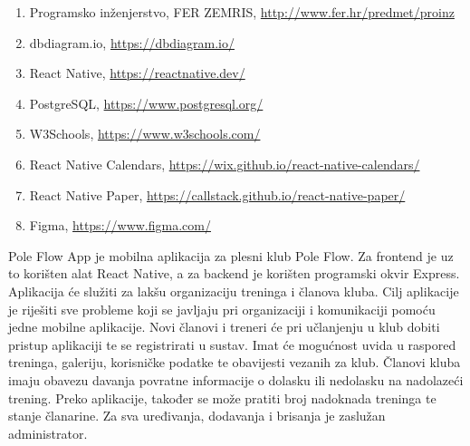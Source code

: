 \documentclass[times, utf8, zavrsni]{fer}
\begin{document}
		\begin{enumerate}
			
			
			\item  Programsko inženjerstvo, FER ZEMRIS, \url{http://www.fer.hr/predmet/proinz}
			
			\item  dbdiagram.io, \url{https://dbdiagram.io/}
			
			\item  React Native, \url{https://reactnative.dev/}
			
			\item  PostgreSQL, \url{https://www.postgresql.org/}
			
			\item  W3Schools, \url{https://www.w3schools.com/}
			
			\item  React Native Calendars, \url{https://wix.github.io/react-native-calendars/}
			
			\item  React Native Paper, \url{https://callstack.github.io/react-native-paper/}
			
			\item Figma, \url{https://www.figma.com/}
			
		\end{enumerate}


\begin{sazetak}
Pole Flow App je mobilna aplikacija za plesni klub Pole Flow. Za frontend je uz to korišten alat React Native, a za backend je korišten programski okvir Express. Aplikacija će služiti za lakšu organizaciju treninga i članova kluba. Cilj aplikacije je riješiti sve probleme koji se javljaju pri organizaciji i komunikaciji pomoću jedne mobilne aplikacije. Novi članovi i treneri će pri učlanjenju u klub dobiti pristup aplikaciji te se registrirati u sustav. Imat će mogućnost uvida u raspored treninga, galeriju, korisničke podatke te obavijesti vezanih za klub. Članovi kluba imaju obavezu davanja povratne informacije o dolasku ili nedolasku na nadolazeći trening. Preko aplikacije, također se može pratiti broj nadoknada treninga te stanje članarine. Za sva uređivanja, dodavanja i brisanja je zaslužan administrator. 

\end{sazetak}
\end{document}

